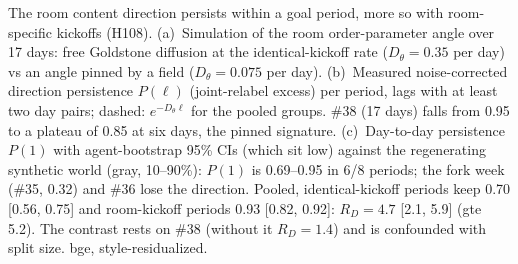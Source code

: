 \caption{The room content direction persists within a goal period, more so with room-specific kickoffs (H108). (a)~Simulation of the room order-parameter angle over 17 days: free Goldstone diffusion at the identical-kickoff rate ($D_\theta=0.35$ per day) vs an angle pinned by a field ($D_\theta=0.075$ per day). (b)~Measured noise-corrected direction persistence $P(\ell)$ (joint-relabel excess) per period, lags with at least two day pairs; dashed: $e^{-D_\theta\ell}$ for the pooled groups. \#38 (17 days) falls from 0.95 to a plateau of 0.85 at six days, the pinned signature. (c)~Day-to-day persistence $P(1)$ with agent-bootstrap 95\% CIs (which sit low) against the regenerating synthetic world (gray, 10--90\%): $P(1)$ is 0.69--0.95 in 6/8 periods; the fork week (\#35, 0.32) and \#36 lose the direction. Pooled, identical-kickoff periods keep 0.70 [0.56, 0.75] and room-kickoff periods 0.93 [0.82, 0.92]: $R_D=4.7$ [2.1, 5.9] (gte 5.2). The contrast rests on \#38 (without it $R_D=1.4$) and is confounded with split size. bge, style-residualized.}
\label{fig:H108}
